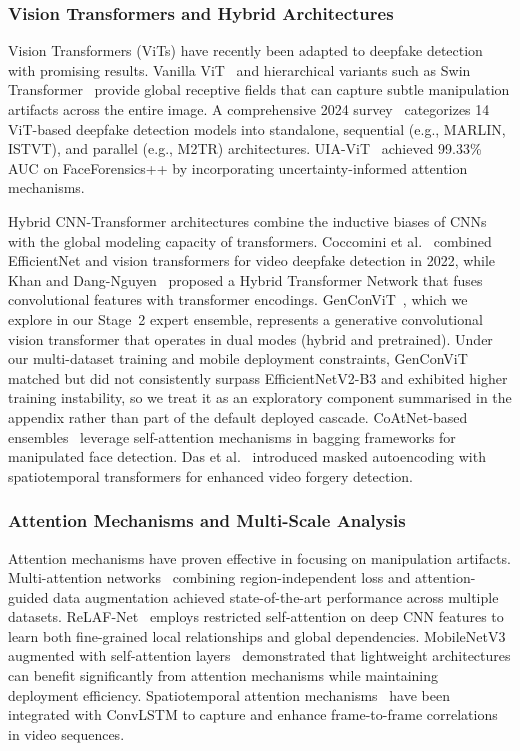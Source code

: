 \subsubsection*{Vision Transformers and Hybrid Architectures}
Vision Transformers (ViTs) have recently been adapted to deepfake detection with promising results. Vanilla ViT~\cite{dosovitskiy2021vit} and hierarchical variants such as Swin Transformer~\cite{liu2021swin} provide global receptive fields that can capture subtle manipulation artifacts across the entire image. A comprehensive 2024 survey~\cite{khan2024vit_survey} categorizes 14 ViT\hyp based deepfake detection models into standalone, sequential (e.g., MARLIN, ISTVT), and parallel (e.g., M2TR) architectures. UIA\hyp ViT~\cite{zhang2022uiavit} achieved 99.33\% AUC on FaceForensics++ by incorporating uncertainty\hyp informed attention mechanisms.

Hybrid CNN\hyp Transformer architectures combine the inductive biases of CNNs with the global modeling capacity of transformers. Coccomini et al.~\cite{coccomini2022efficientnet_vit} combined EfficientNet and vision transformers for video deepfake detection in 2022, while Khan and Dang\hyp Nguyen~\cite{khan2022hybrid_transformer_df} proposed a Hybrid Transformer Network that fuses convolutional features with transformer encodings. GenConViT~\cite{genconvit_github}, which we explore in our Stage~2 expert ensemble, represents a generative convolutional vision transformer that operates in dual modes (hybrid and pretrained). Under our multi\hyp dataset training and mobile deployment constraints, GenConViT matched but did not consistently surpass EfficientNetV2\hyp B3 and exhibited higher training instability, so we treat it as an exploratory component summarised in the appendix rather than part of the default deployed cascade. CoAtNet\hyp based ensembles~\cite{naz2023coatnet} leverage self\hyp attention mechanisms in bagging frameworks for manipulated face detection. Das et al.~\cite{das2023mae_spatiotemporal} introduced masked autoencoding with spatiotemporal transformers for enhanced video forgery detection.

\subsubsection*{Attention Mechanisms and Multi-Scale Analysis}
Attention mechanisms have proven effective in focusing on manipulation artifacts. Multi\hyp attention networks~\cite{zhao2025multiattention} combining region\hyp independent loss and attention\hyp guided data augmentation achieved state\hyp of\hyp the\hyp art performance across multiple datasets. ReLAF\hyp Net~\cite{wang2024relafnet} employs restricted self\hyp attention on deep CNN features to learn both fine\hyp grained local relationships and global dependencies. MobileNetV3 augmented with self\hyp attention layers~\cite{khan2024mobilenet_attention} demonstrated that lightweight architectures can benefit significantly from attention mechanisms while maintaining deployment efficiency. Spatiotemporal attention mechanisms~\cite{zhang2024adlnet,xception_convlstm2022} have been integrated with ConvLSTM to capture and enhance frame\hyp to\hyp frame correlations in video sequences.

